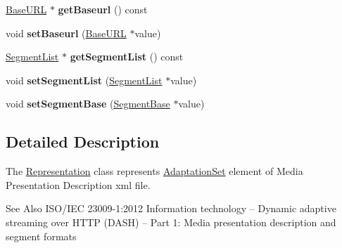 \begin{DoxyCompactItemize}
\item 
\hypertarget{class_representation_ac98b7e695c72f779fa526295178f0250}{\hyperlink{class_base_u_r_l}{Base\-U\-R\-L} $\ast$ {\bfseries get\-Baseurl} () const }\label{class_representation_ac98b7e695c72f779fa526295178f0250}

\item 
\hypertarget{class_representation_ad41ecf11e7bc0df85d4783a1584d2f03}{void {\bfseries set\-Baseurl} (\hyperlink{class_base_u_r_l}{Base\-U\-R\-L} $\ast$value)}\label{class_representation_ad41ecf11e7bc0df85d4783a1584d2f03}

\item 
\hypertarget{class_representation_affd2bb951e1e0521a314111ce2bf5853}{\hyperlink{class_segment_list}{Segment\-List} $\ast$ {\bfseries get\-Segment\-List} () const }\label{class_representation_affd2bb951e1e0521a314111ce2bf5853}

\item 
\hypertarget{class_representation_ae4ce85864f025ac1c01c71cdc19fa4e0}{void {\bfseries set\-Segment\-List} (\hyperlink{class_segment_list}{Segment\-List} $\ast$value)}\label{class_representation_ae4ce85864f025ac1c01c71cdc19fa4e0}

\item 
\hypertarget{class_representation_a871d457a4f692048dc29410f72ca87e8}{void {\bfseries set\-Segment\-Base} (\hyperlink{class_segment_base}{Segment\-Base} $\ast$value)}\label{class_representation_a871d457a4f692048dc29410f72ca87e8}

\end{DoxyCompactItemize}


\subsection{Detailed Description}
The \hyperlink{class_representation}{Representation} class represents \hyperlink{class_adaptation_set}{Adaptation\-Set} element of Media Presentation Description xml file. 

\begin{DoxySeeAlso}{See Also}
I\-S\-O/\-I\-E\-C 23009-\/1\-:2012 Information technology – Dynamic adaptive streaming over H\-T\-T\-P (D\-A\-S\-H) – Part 1\-: Media presentation description and segment formats 
\end{DoxySeeAlso}


